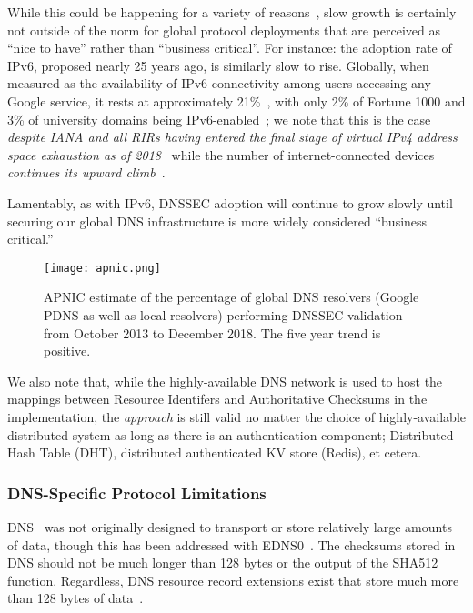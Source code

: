 While this could be happening for a variety of reasons~\cite{DNSSEC-is-hard-1,
DNSSEC-is-hard-2, DNSSEC-is-hard-3, DNSSEC-is-hard-4, DNSSEC-is-hard-5}, slow
growth is certainly not outside of the norm for global protocol deployments that
are perceived as ``nice to have'' rather than ``business critical''. For
instance: the adoption rate of IPv6, proposed nearly 25 years ago, is similarly
slow to rise. Globally, when measured as the availability of IPv6 connectivity
among users accessing any Google service, it rests at approximately
21\%~\cite{Google-IPv6}, with only 2\% of Fortune 1000 and 3\% of university
domains being IPv6-enabled~\cite{NIST-IPv6}; we note that this is the case
\emph{despite IANA and all RIRs having entered the final stage of virtual IPv4
address space exhaustion as of 2018}~\cite{APNIC-exhaustion} while the number of
internet-connected devices \emph{continues its upward climb}~\cite{Cisco}.

Lamentably, as with IPv6, DNSSEC adoption will continue to grow slowly until
securing our global DNS infrastructure is more widely considered ``business
critical.''

\begin{figure*}[t]
    \centering
    \texttt{[image: apnic.png]}
    \caption{APNIC estimate of the percentage of global DNS resolvers (Google
    PDNS as well as local resolvers) performing DNSSEC validation from October
    2013 to December 2018. The five year trend is positive.}\label{fig:apnic}
\end{figure*}

We also note that, while the highly-available DNS network is used to host the
mappings between Resource Identifers and Authoritative Checksums in the \SYSTEM{}
implementation, the \SYSTEM{} \emph{approach} is still valid no matter the
choice of highly-available distributed system as long as there is an
authentication component; \eg Distributed Hash Table (DHT), distributed
authenticated KV store (\eg Redis), et cetera.

\subsubsection{DNS-Specific Protocol Limitations}

DNS~\cite{DNS1} was not originally designed to transport or store relatively
large amounts of data, though this has been addressed with EDNS0~\cite{EDNS}.
The checksums stored in DNS should not be much longer than 128 bytes or the
output of the SHA512 function. Regardless, DNS resource record extensions exist
that store much more than 128 bytes of data~\cite{CERT, IPSECKEY, DANE3, DANE1}.

